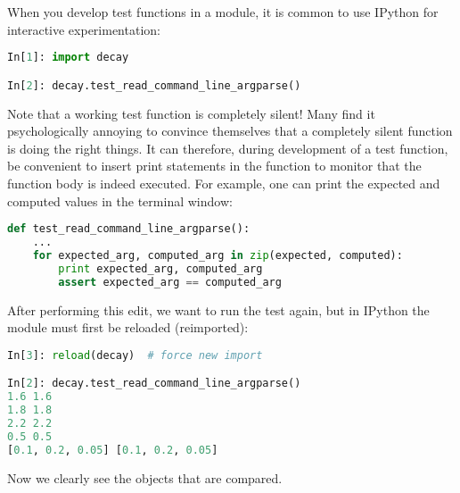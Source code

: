\documentclass[graybox,sectrefs,envcountresetchap,open=right,final]{svmonodo}
\newenvironment{warning_mdfboxadmon}[1][]{
\begin{warning_mdfboxmdframed}[frametitle=#1]
}
{
\end{warning_mdfboxmdframed}
}
\begin{document}
\begin{warning_mdfboxadmon}
When you develop test functions in a module, it is common to use IPython
for interactive experimentation:





\begin{lstlisting}[language=python,style=blue1_bluegreen]
In[1]: import decay

In[2]: decay.test_read_command_line_argparse()

\end{lstlisting}


Note that a working test function is completely silent! Many
find it psychologically annoying to convince themselves that a
completely silent function is doing the right things. It can therefore,
during development of a test function, be convenient to insert
print statements in the function to monitor that the function body
is indeed executed. For example, one can print the expected and
computed values in the terminal window:







\begin{lstlisting}[language=python,style=blue1_bluegreen]
def test_read_command_line_argparse():
    ...
    for expected_arg, computed_arg in zip(expected, computed):
        print expected_arg, computed_arg
        assert expected_arg == computed_arg

\end{lstlisting}

After performing this edit, we want to run the test again, but
in IPython the module must first be reloaded (reimported):










\begin{lstlisting}[language=python,style=blue1_bluegreen]
In[3]: reload(decay)  # force new import

In[2]: decay.test_read_command_line_argparse()
1.6 1.6
1.8 1.8
2.2 2.2
0.5 0.5
[0.1, 0.2, 0.05] [0.1, 0.2, 0.05]

\end{lstlisting}

Now we clearly see the objects that are compared.
\end{warning_mdfboxadmon} %
\end{document}
